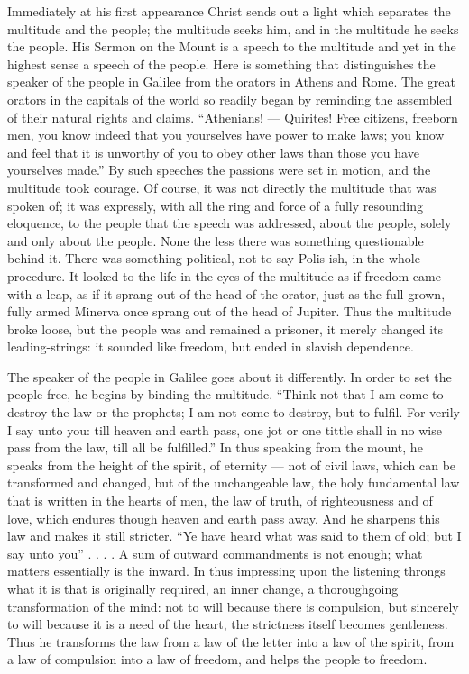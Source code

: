 \documentclass[12pt,a4paper,openany]{book}
\newcommand{\opage}[1]{\marginnote{\footnotesize\textit{[#1]}}}
\begin{document}
Immediately at his first appearance Christ sends out a light which separates the multitude and the people; the multitude seeks him, and in the multitude he seeks the people. His Sermon on the Mount is a speech to the multitude and yet in the highest sense a speech of the people. Here is something that
\setcounter{footnote}{0}%
\opage{21}distinguishes the speaker of the people in Galilee from the orators in Athens and Rome. The great orators in the capitals of the world so readily began by reminding the assembled of their natural rights and claims. ``Athenians! --- Quirites! Free citizens, freeborn men, you know indeed that you yourselves have power to make laws; you know and feel that it is unworthy of you to obey other laws than those you have yourselves made.'' By such speeches the passions were set in motion, and the multitude took courage. Of course, it was not directly the multitude that was spoken of; it was expressly, with all the ring and force of a fully resounding eloquence, to the people that the speech was addressed, about the people, solely and only about the people. None the less there was something questionable behind it. There was something political, not to say Polis-ish, in the whole procedure. It looked to the life in the eyes of the multitude as if freedom came with a leap, as if it sprang out of the head of the orator, just as the full-grown, fully armed Minerva once sprang out of the head of Jupiter. Thus the multitude broke loose, but the people was and remained a prisoner, it merely changed its leading-strings: it sounded like freedom, but ended in slavish dependence.

The speaker of the people in Galilee goes about it differently. In order to set the people free, he begins by binding the multitude. ``Think not that I am come to destroy the law or the prophets; I am not come to destroy, but to fulfil. For verily I say unto you: till heaven and earth pass, one jot or one tittle shall in no wise pass from the law, till all be fulfilled.'' In thus speaking from the mount, he speaks from the height of the spirit, of eternity --- not of civil laws, which can be transformed
\setcounter{footnote}{0}%
\opage{22}and changed, but of the unchangeable law, the holy fundamental law that is written in the hearts of men, the law of truth, of righteousness and of love, which endures though heaven and earth pass away. And he sharpens this law and makes it still stricter. ``Ye have heard what was said to them of old; but I say unto you'' . . . . A sum of outward commandments is not enough; what matters essentially is the inward. In thus impressing upon the listening throngs what it is that is originally required, an inner change, a thoroughgoing transformation of the mind: not to will because there is compulsion, but sincerely to will because it is a need of the heart, the strictness itself becomes gentleness. Thus he transforms the law from a law of the letter into a law of the spirit, from a law of compulsion into a law of freedom, and helps the people to freedom.
\end{document}
